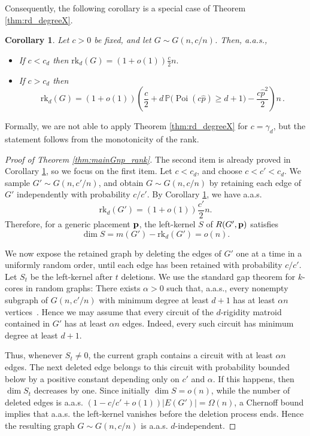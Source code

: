 \documentclass[reqno,english]{amsart}
\numberwithin{equation}{section}
\newtheorem{corollary}[theorem]{Corollary}
\theoremstyle{definition}{
\newtheorem{example}[theorem]{Example}
\newtheorem{definition}[theorem]{Definition}
\newtheorem*{definition*}{Definition}
\newtheorem{problem}[theorem]{Problem}
\newtheorem{question}[theorem]{Question}
}
\renewcommand{\P}{\mathbb P}
\newcommand{\p}{{\bf p}}
\begin{document}
Consequently, the following corollary is a special case of Theorem \ref{thm:rd_degreeX}.
\begin{corollary}\label{cor:rd_ER}
    Let \(c>0\) be fixed, and let \(G\sim G(n,c/n)\). Then, a.a.s.,       
    \begin{itemize}
        \item If \(c<c_d\) then \(\mathrm{rk}_d(G) = (1+o(1))\frac{c}2n.\)
        \item If \(c>c_d\) then \[\mathrm{rk}_d(G) = (1+o(1))\left(\frac c2 + d\,\P\big(\operatorname{Poi}(c\hat p)\ge d+1\big)
        - \frac{c\hat p^2}{2}
        \right)n\,.\]
    \end{itemize}
\end{corollary}
Formally, we are not able to apply Theorem \ref{thm:rd_degreeX} for $c=\gamma_d$, but the statement follows from the monotonicity of the rank.
\begin{proof}[Proof of Theorem \ref{thm:mainGnp_rank}]
The second item is already proved in Corollary \ref{cor:rd_ER}, so we focus on the first item. 
Let \(c<c_d\), and choose
\(c<c'<c_d\). We sample \(G'\sim G(n,c'/n)\), and obtain
\(G\sim G(n,c/n)\) by retaining each edge of \(G'\) independently with
probability \(c/c'\). By Corollary \ref{cor:rd_ER}, we have a.a.s.
\[
    \mathrm{rk}_d(G')=(1+o(1))\frac{c'}2 n.
\]
Therefore, for a generic placement \(\p\), the left-kernel \(S\) of
\(R(G',\p)\) satisfies
\[
    \dim S=m(G')-\mathrm{rk}_d(G')=o(n).
\]

We now expose the retained graph by deleting the edges of \(G'\) one at a
time in a uniformly random order, until each edge has been retained with
probability \(c/c'\). Let \(S_t\) be the left-kernel after \(t\) deletions.
We use the standard gap theorem for \(k\)-cores in random graphs:
There exists $\alpha >0$ such that, a.a.s., every nonempty subgraph of
\(G(n,c'/n)\) with minimum degree at least \(d+1\) has at least
\(\alpha n\) vertices~\cite{LuczakCoreSize}. Hence we may assume that every circuit of the \(d\)-rigidity matroid contained in \(G'\) has at least
\(\alpha n\) edges. Indeed, every such circuit has minimum degree at least
\(d+1\).

Thus, whenever \(S_t\neq 0\), the current graph contains a circuit with at
least \(\alpha n\) edges. The next deleted edge belongs to this circuit
with probability bounded below by a positive constant depending only on
\(c'\) and \(\alpha\). If this happens, then \(\dim S_t\) decreases by
one. Since initially \(\dim S=o(n)\), while the number of deleted edges is a.a.s.
\((1-c/c'+o(1))|E(G')|=\Omega(n)\), a Chernoff bound implies that a.a.s.
the left-kernel vanishes before the deletion process ends. Hence the
resulting graph \(G\sim G(n,c/n)\) is a.a.s. $d$-independent.
\end{proof}
\end{document}
